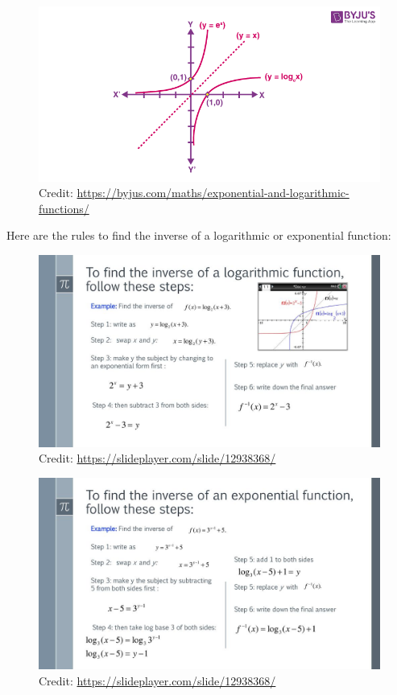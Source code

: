 \documentclass[12pt]{article}
\begin{document}
\begin{figure}[H]
	\centering
	\includegraphics[scale=0.5]{inv.png}
	\caption{Credit: \url{https://byjus.com/maths/exponential-and-logarithmic-functions/}}
\end{figure}

Here are the rules to find the inverse of a logarithmic or exponential function:\\

\begin{figure}[H]
	\centering
	\includegraphics[scale=1.75]{loginv.jpg}
	\caption{Credit: \url{https://slideplayer.com/slide/12938368/}}
\end{figure}

\begin{figure}[H]
	\centering
	\includegraphics[scale=1.75]{expinv.jpg}
	\caption{Credit: \url{https://slideplayer.com/slide/12938368/}}
\end{figure}
\end{document}
